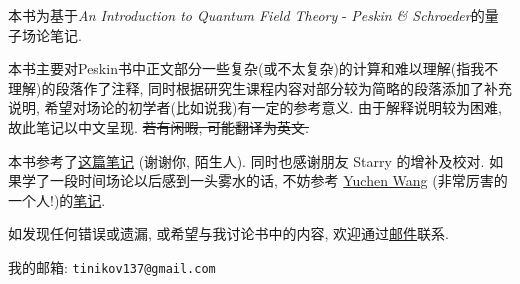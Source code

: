 
\begin{spacing}{1.8}
  本书为基于\textit{An Introduction to Quantum Field Theory} - \textit{Peskin \& Schroeder}的量子场论笔记.

  \mbox{}

  本书主要对Peskin书中正文部分一些复杂(或不太复杂)的计算和难以理解(指我不理解)的段落作了注释, 同时根据研究生课程内容对部分较为简略的段落添加了补充说明, 希望对场论的初学者(比如说我)有一定的参考意义.
  由于解释说明较为困难, 故此笔记以中文呈现.
  \sout{若有闲暇, 可能翻译为英文. }

  \mbox{}

  本书参考了\href{http://gamebm.shoutwiki.com/wiki/Lecture_Notes_of_An_Introduction_to_Quantum_Field_Theory_by_M._Peskin_and_D._Schroeder}{这篇笔记} (谢谢你, 陌生人).
  同时也感谢朋友 Starry 的增补及校对.
  如果学了一段时间场论以后感到一头雾水的话, 不妨参考 \href{https://yuchenw.blog}{Yuchen Wang} (非常厉害的一个人!)的\href{https://yuchenw.blog/qft-notes}{笔记}.

  \mbox{}

  如发现任何错误或遗漏, 或希望与我讨论书中的内容, 欢迎通过\href{mailto:tinikov137@gmail.com}{邮件}联系.

  我的邮箱: \texttt{tinikov137@gmail.com}
\end{spacing}
\pagestyle{general}